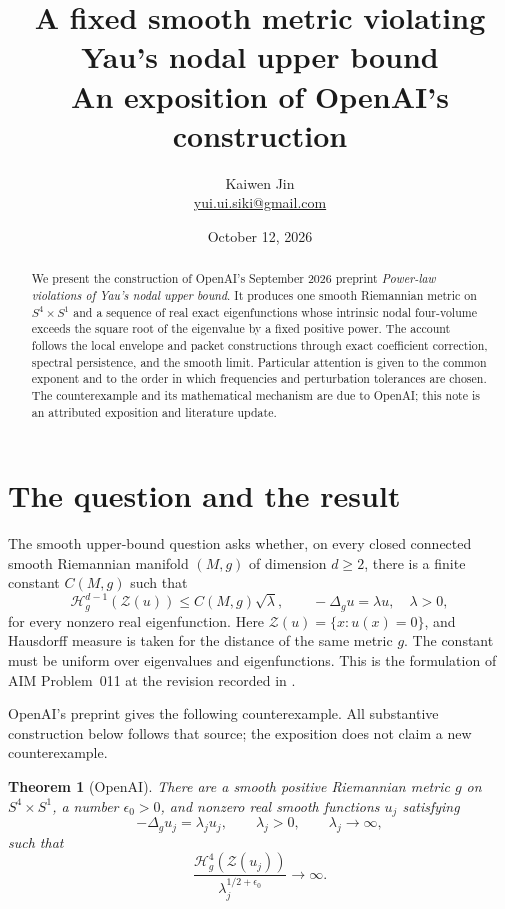 \documentclass[11pt]{article}
\title{A fixed smooth metric violating Yau's nodal upper bound\\
 \large An exposition of OpenAI's construction}
\author{Kaiwen Jin\\
 \small\href{mailto:yui.ui.siki@gmail.com}{yui.ui.siki@gmail.com}}
\date{October 12, 2026}
\newcommand{\HH}{\mathcal H}
\newcommand{\Z}{\mathcal Z}
\newtheorem{theorem}{Theorem}[section]
\theoremstyle{definition}
\theoremstyle{remark}
\numberwithin{equation}{section}
\begin{document}
\maketitle
\begin{abstract}
We present the construction of OpenAI's September 2026 preprint
\emph{Power-law violations of Yau's nodal upper bound}.
It produces one smooth Riemannian metric on \(S^4\times S^1\) and a
sequence of real exact eigenfunctions whose intrinsic nodal four-volume
exceeds the square root of the eigenvalue by a fixed positive power.
The account follows the local envelope and packet constructions through
exact coefficient correction, spectral persistence, and the smooth
limit. Particular attention is given to the common exponent and to the
order in which frequencies and perturbation tolerances are chosen.
The counterexample and its mathematical mechanism are due to OpenAI;
this note is an attributed exposition and literature update.
\end{abstract}

\section{The question and the result}\label{sec:intro}

The smooth upper-bound question asks whether, on every closed connected
smooth Riemannian manifold \((M,g)\) of dimension \(d\ge2\), there is a
finite constant \(C(M,g)\) such that
\begin{equation}\label{eq:question}
 \HH_g^{d-1}(\Z(u))\le C(M,g)\sqrt{\lambda},
 \qquad -\Delta_g u=\lambda u,\quad \lambda>0,
\end{equation}
for every nonzero real eigenfunction. Here
\(\Z(u)=\{x:u(x)=0\}\), and Hausdorff measure is taken for the distance
of the same metric \(g\). The constant must be uniform over eigenvalues
and eigenfunctions. This is the formulation of AIM Problem~011 at the
revision recorded in \cite{AIM011}.

OpenAI's preprint \cite[Theorem~1.1]{OpenAI2026} gives the following
counterexample. All substantive construction below follows that source;
the exposition does not claim a new counterexample.

\begin{theorem}[OpenAI]\label{thm:main}
There are a smooth positive Riemannian metric \(g\) on \(S^4\times S^1\),
a number \(\epsilon_0>0\), and nonzero real smooth functions \(u_j\)
satisfying
\[
 -\Delta_g u_j=\lambda_j u_j,\qquad
 \lambda_j>0,\qquad \lambda_j\longrightarrow\infty,
\]
such that
\begin{equation}\label{eq:main}
 \frac{\HH_g^4(\Z(u_j))}
      {\lambda_j^{1/2+\epsilon_0}}\longrightarrow\infty.
\end{equation}
\end{theorem}
\end{document}
